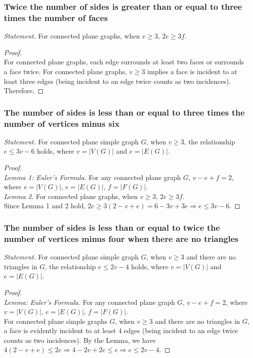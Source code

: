 \documentclass[a4paper,12pt]{report}
\begin{document}
\subsubsection{Twice the number of sides is greater than or equal to three times the number of faces}
\textit{Statement. }For connected plane graphs, when \(v \geq 3\), \(2e \geq 3f\).
\begin{proof}\mbox{}\\
For connected plane graphs, each edge surrounds at least two faces or surrounds a face twice. For connected plane graphs, \(v \geq 3\) implies a face is incident to at least three edges (being incident to an edge twice counts as two incidences). Therefore,
\end{proof}
\subsubsection{The number of sides is less than or equal to three times the number of vertices minus six}
\textit{Statement. }For connected plane simple graph \(G\), when \(v \geq 3\), the relationship \(e \leq 3v - 6\) holds, where \(v = |V(G)|\) and \(e = |E(G)|\).
\begin{proof}\mbox{}\\
\textit{Lemma 1: Euler's Formula. }For any connected plane graph \(G\), \(v - e + f = 2\), where \(v=|V(G)|\), \(e=|E(G)|\), \(f=|F(G)|\). \\
\textit{Lemma 2. }For connected plane graphs, when \(v \geq 3\), \(2e \geq 3f\). \\
Since Lemma 1 and 2 hold, \(2e \geq 3(2 - v + e) = 6 - 3v + 3e \Rightarrow e \leq 3v - 6\).
\end{proof}
\subsubsection{The number of sides is less than or equal to twice the number of vertices minus four when there are no triangles}
\textit{Statement. }For connected plane simple graph \(G\), when \(v \geq 3\) and there are no triangles in \(G\), the relationship \(e \leq 2v - 4\) holds, where \(v = |V(G)|\) and \(e = |E(G)|\).
\begin{proof}\mbox{}\\
\textit{Lemma: Euler's Formula. }For any connected plane graph \(G\), \(v - e + f = 2\), where \(v=|V(G)|\), \(e=|E(G)|\), \(f=|F(G)|\). \\
For connected plane simple graphs \(G\), when \(v \geq 3\) and there are no triangles in \(G\), a face is evidently incident to at least $4$ edges (being incident to an edge twice counts as two incidences). By the Lemma, we have \(4(2 - v + e) \leq 2e \Rightarrow 4 - 2v + 2e \leq e \Rightarrow e \leq 2v - 4\).
\end{proof}
\end{document}
